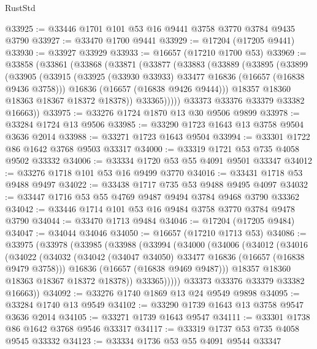 \begin{lexlean}{RustStd}
\begin{coremodule}
@33925 := @33446 @1701 @101 @53 @16 @9441 @3758 @3770 @3784 @9435 @3790
@33927 := @33470 @1700 @9441
@33929 := @17204 (@17205 @9441)
@33930 := @33927 @33929
@33933 := @16657 (@17210 @1700 @53)
@33969 := @33858
    (@33861
      (@33868
        (@33871
          (@33877
            (@33883
              (@33889
                (@33895
                  (@33899
                    (@33905
                      (@33915
                        (@33925 (@33930 @33933) @33477 @16836 (@16657 (@16838 @9436 @3758)))
                        @16836
                        (@16657 (@16838 @9426 @9444)))
                      @18357
                      @18360
                      @18363
                      @18367
                      @18372
                      @18378))
                  @33365)))))
        @33373
        @33376
        @33379
        @33382
        @16663))
@33975 := @33276 @1724 @1870 @13 @30 @9506 @9899
@33978 := @33284 @1724 @13 @9506
@33985 := @33290 @1723 @1643 @13 @3758 @9504 @3636 @2014
@33988 := @33271 @1723 @1643 @9504
@33994 := @33301 @1722 @86 @1642 @3768 @9503 @33317
@34000 := @33319 @1721 @53 @735 @4058 @9502 @33332
@34006 := @33334 @1720 @53 @55 @4091 @9501 @33347
@34012 := @33276 @1718 @101 @53 @16 @9499 @3770
@34016 := @33431 @1718 @53 @9488 @9497
@34022 := @33438 @1717 @735 @53 @9488 @9495 @4097
@34032 := @33447 @1716 @53 @55 @4769 @9487 @9494 @3784 @9468 @3790 @33362
@34042 := @33446 @1714 @101 @53 @16 @9484 @3758 @3770 @3784 @9478 @3790
@34044 := @33470 @1713 @9484
@34046 := @17204 (@17205 @9484)
@34047 := @34044 @34046
@34050 := @16657 (@17210 @1713 @53)
@34086 := @33975
    (@33978
      (@33985
        (@33988
          (@33994
            (@34000
              (@34006
                (@34012
                  (@34016
                    (@34022
                      (@34032
                        (@34042 (@34047 @34050) @33477 @16836 (@16657 (@16838 @9479 @3758)))
                        @16836
                        (@16657 (@16838 @9469 @9487)))
                      @18357
                      @18360
                      @18363
                      @18367
                      @18372
                      @18378))
                  @33365)))))
        @33373
        @33376
        @33379
        @33382
        @16663))
@34092 := @33276 @1740 @1869 @13 @24 @9549 @9898
@34095 := @33284 @1740 @13 @9549
@34102 := @33290 @1739 @1643 @13 @3758 @9547 @3636 @2014
@34105 := @33271 @1739 @1643 @9547
@34111 := @33301 @1738 @86 @1642 @3768 @9546 @33317
@34117 := @33319 @1737 @53 @735 @4058 @9545 @33332
@34123 := @33334 @1736 @53 @55 @4091 @9544 @33347

\end{coremodule}
\end{lexlean}
